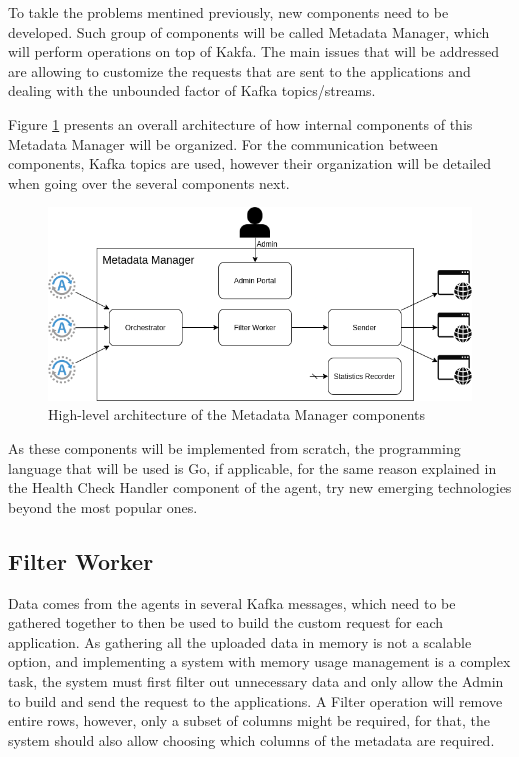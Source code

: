 To takle the problems mentined previously, new components need to be developed.
Such group of components will be called Metadata Manager, which will perform operations on top of Kakfa.
The main issues that will be addressed are allowing to customize the requests that are sent to the applications and dealing with the unbounded factor of Kafka topics/streams.

Figure \ref{fig:metadata-manager} presents an overall architecture of how internal components of this Metadata Manager will be organized.
For the communication between components, Kafka topics are used, however their organization will be detailed when going over the several components next.

\begin{figure}[H]
    \center
    \includegraphics[width=\textwidth]{metadata-manager}
    \caption{High-level architecture of the Metadata Manager components}
    \label{fig:metadata-manager}
\end{figure}

As these components will be implemented from scratch, the programming language that will be used is Go, if applicable, for the same reason explained in the Health Check Handler component of the agent, try new emerging technologies beyond the most popular ones.

\subsection{Filter Worker}

Data comes from the agents in several Kafka messages, which need to be gathered together to then be used to build the custom request for each application.
As gathering all the uploaded data in memory is not a scalable option, and implementing a system with memory usage management is a complex task, the system must first filter out unnecessary data and only allow the Admin to build and send the request to the applications.
A Filter operation will remove entire rows, however, only a subset of columns might be required, for that, the system should also allow choosing which columns of the metadata are required.

